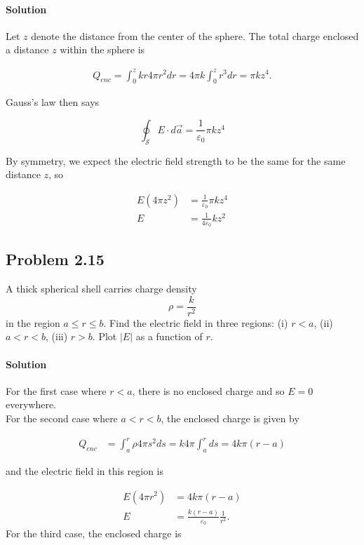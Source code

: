 \documentclass{article}
\begin{document}
\paragraph{Solution} Let $z$ denote the distance from the center of the sphere. The total charge enclosed a distance $z$ within the sphere is 

\begin{align*}
    Q_{enc} = \int_0^z kr4\pi r^2 dr = 4\pi k \int_0^z r^3 dr = \pi k z^4.
\end{align*}

Gauss's law then says 

$$
\oint_{\mathcal{S}}E \cdot d\vec{a} = \frac{1}{\varepsilon_0}\pi k z^4
$$

By symmetry, we expect the electric field strength to be the same for the same distance $z$, so 

\begin{align*}
    E(4\pi z^2) &= \frac{1}{\varepsilon_0}\pi k z^4 \\
    E &= \frac{1}{4\varepsilon_0}k z^2
\end{align*}


\newpage
\subsection*{Problem 2.15}
A thick spherical shell carries charge density
$$
\rho = \frac{k}{r^2}
$$
in the region $a \leq r \leq b$. Find the electric field in three regions: (i) $r < a$, (ii) $a < r< b$, (iii) $r > b$. Plot $|E|$ as a function of $r$.

\paragraph{Solution} For the first case where $r < a$, there is no enclosed charge and so $E = 0$ everywhere. \\

For the second case where $a < r< b$, the enclosed charge is given by

\begin{align*}
    Q_{enc} &= \int_a^r \rho 4\pi s^2 ds
    = k4\pi \int_a^r ds = 4k\pi(r - a)
\end{align*}

and the electric field in this region is 

\begin{align*}
    E (4\pi r^2) &= 4k\pi(r - a) \\
    E &= \frac{k(r - a)}{\varepsilon_0} \frac{1}{r^2}.
\end{align*}
For the third case, the enclosed charge is 
\end{document}
